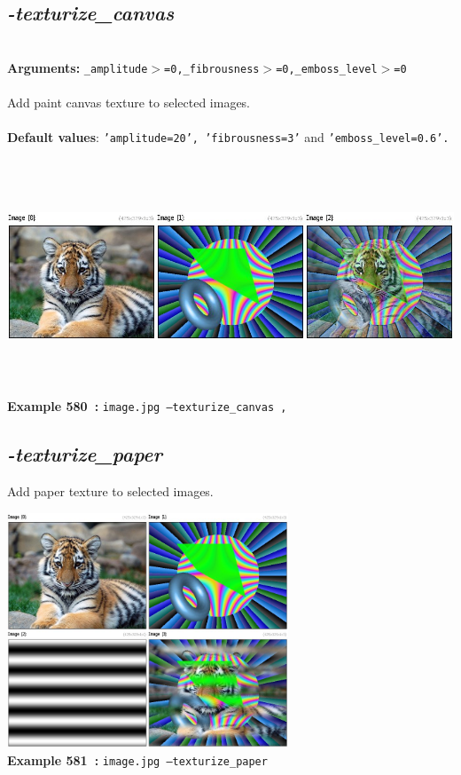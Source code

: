 \documentclass[a4paper,11pt,twoside]{book}
\begin{document}
\subsection{\emph{-texturize\_canvas} }\vspace*{-0.5em}
~\\\textbf{Arguments: } 
{\small \texttt{\_amplitude$>$=0,\_fibrousness$>$=0,\_emboss\_level$>$=0}}\\~\\
Add paint canvas texture to selected images.
~\\~\\\textbf{Default values}: {\small \texttt{'amplitude=20', 'fibrousness=3'} and \texttt{'emboss\_level=0.6'.}}
\begin{center}\includegraphics[keepaspectratio=true,height=7cm,width=\textwidth]{img/gmic_def580.jpg}\\
{\footnotesize \textbf{Example 580~:} \texttt{image.jpg --texturize\_canvas ,}}
\end{center}

\subsection{\emph{-texturize\_paper} }\vspace*{-0.5em}
Add paper texture to selected images.
\begin{center}\includegraphics[keepaspectratio=true,height=7cm,width=\textwidth]{img/gmic_def581.jpg}\\
{\footnotesize \textbf{Example 581~:} \texttt{image.jpg --texturize\_paper}}
\end{center}
\end{document}
